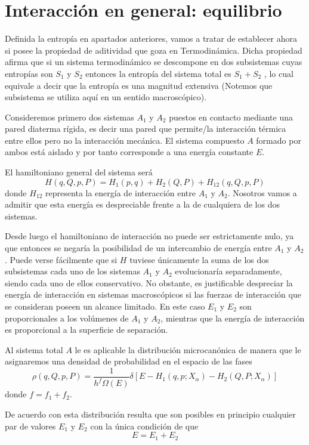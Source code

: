\section{Interacción en general: equilibrio}

Definida la entropía en apartados anteriores, vamos a tratar de establecer ahora si posee la propiedad de aditividad que goza en Termodinámica. Dicha propiedad afirma que si un sistema termodinámico se descompone en dos subsistemas cuyas entropías son $S_1$ y $S_2$ entonces la entropía del sistema total es $S_1 + S_2$ , lo cual equivale a decir que la entropía es una magnitud extensiva (Notemos que subsistema se utiliza aquí en un sentido macroscópico).

Consideremos primero dos sistemas $A_1$ y $A_2$ puestos en contacto mediante una pared diaterma rígida, es decir una pared que permite/la interacción térmica entre ellos pero no la interacción mecánica. El sistema compuesto $A$ formado por ambos está aislado y por tanto corresponde a una energía constante $E$.

El hamiltoniano general del sistema será
$$H(q,Q,p,P) = H_1(p,q) + H_2 (Q,P) + H_{12}(q,Q,p,P)$$
donde $H_{12}$ representa la energía de interacción entre $A_1$ y $A_2$. Nosotros vamos a admitir que esta energía es despreciable frente a la de cualquiera de los dos sistemas.

Desde luego el hamiltoniano de interacción no puede ser estrictamente nulo, ya que entonces se negaría la posibilidad de un intercambio de energía entre $A_1$ y $A_2$.
Puede verse fácilmente que si $H$ tuviese únicamente la suma de los dos subsistemas cada uno de los sistemas $A_1$ y $A_2$ evolucionaría separadamente, siendo cada uno de ellos conservativo.
No obstante, es justificable despreciar la energía de interacción en sistemas macroscópicos si las fuerzas de interacción que se consideran poseen un alcance limitado. 
En este caso $E_1$ y $E_2$ son proporcionales a los volúmenes de $A_1$ y $A_2$, mientras que la energía de interacción es proporcional a la superficie de separación.

Al sistema total $A$ le es aplicable la distribución microcanónica de manera que le asignaremos una densidad de probabilidad en el espacio de las fases
\begin{equation}
	\rho(q,Q,p,P) = \frac{1}{h^f \Omega(E)} \delta \left[ E - H_1(q,p;X_\alpha) - H_2(Q,P;X_\alpha) \right]
\end{equation}
donde $f = f_1 + f_2$.

De acuerdo con esta distribución resulta que son posibles en principio cualquier
par de valores $E_1$ y $E_2$ con la única condición de que
$$E = E_1+ E_2$$

